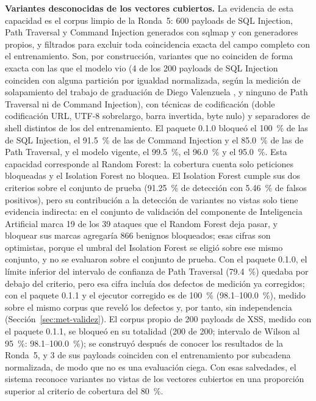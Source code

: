 \textbf{Variantes desconocidas de los vectores cubiertos.} La evidencia de esta capacidad es el
corpus limpio de la Ronda~5: 600 payloads de SQL Injection, Path Traversal y Command Injection
generados con sqlmap y con generadores propios, y filtrados para excluir toda coincidencia exacta
del campo completo con el entrenamiento. Son, por construcción, variantes que no coinciden de forma
exacta con las que el modelo vio (4 de los 200 payloads de SQL Injection coinciden con alguna
partición por igualdad normalizada, según la medición de solapamiento del trabajo de graduación de Diego Valenzuela \cite{valenzuela2026ia}, y ninguno de Path Traversal ni de Command Injection), con técnicas de codificación (doble codificación URL, UTF-8 sobrelargo, barra invertida,
byte nulo) y separadores de shell distintos de los del entrenamiento. El paquete 0.1.0 bloqueó
el 100~\% de las de SQL Injection, el 91.5~\% de las de Command Injection y el 85.0~\% de las de
Path Traversal, y el modelo vigente, el 99.5~\%, el 96.0~\% y el 95.0~\%. Esta capacidad corresponde
al Random Forest: la cobertura cuenta solo peticiones bloqueadas y el Isolation Forest no bloquea.
El Isolation Forest cumple sus dos criterios sobre el conjunto de prueba (91.25~\% de detección con
5.46~\% de falsos positivos), pero su contribución a la detección de variantes no vistas solo tiene
evidencia indirecta: en el conjunto de validación del componente de Inteligencia Artificial \cite{valenzuela2026ia} marca 19
de los 39 ataques que el Random Forest deja pasar, y bloquear sus marcas agregaría 866 benignos
bloqueados; esas cifras son optimistas, porque el umbral del Isolation Forest se eligió sobre ese
mismo conjunto, y no se evaluaron sobre el conjunto de prueba. Con el paquete 0.1.0, el límite inferior del intervalo de confianza de Path Traversal
(79.4~\%) quedaba por debajo del criterio, pero esa cifra incluía dos defectos de medición ya
corregidos; con el paquete 0.1.1 y el ejecutor corregido es de 100~\% (98.1--100.0~\%), medido
sobre el mismo corpus que reveló los defectos y, por tanto, sin independencia
(Sección~\ref{sec:met-validez}). El corpus propio de 200 payloads de XSS, medido con el paquete 0.1.1, se bloqueó en su
totalidad (200 de 200; intervalo de Wilson al 95~\%: 98.1--100.0~\%); se construyó después de
conocer los resultados de la Ronda~5, y 3 de sus payloads coinciden con el entrenamiento por
subcadena normalizada, de modo que no es una evaluación ciega. Con esas salvedades, el sistema
reconoce variantes no vistas de los vectores cubiertos en una proporción superior al criterio de
cobertura del 80~\%.

